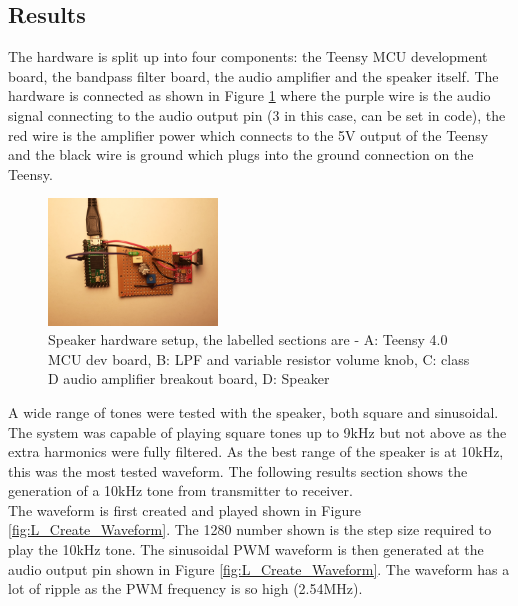 \subsection{Results}
The hardware is split up into four components: the Teensy MCU development board, the bandpass filter board, the audio amplifier and the speaker itself. The hardware is connected as shown in Figure \ref{fig:L_Hardware} where the purple wire is the audio signal connecting to the audio output pin (3 in this case, can be set in code), the red wire is the amplifier power which connects to the 5V output of the Teensy and the black wire is ground which plugs into the ground connection on the Teensy. \\

\begin{figure} [!htb]
	\captionsetup{justification=centering}
	\hfill\includegraphics[width=0.4\textwidth]{./images/speaker/L_Hardware}\hspace{\fill}
	\caption{Speaker hardware setup, the labelled sections are - A: Teensy 4.0 MCU dev board, B: LPF and variable resistor volume knob, C: class D audio amplifier breakout board, D: Speaker}
	\label{fig:L_Hardware}
\end{figure} 

A wide range of tones were tested with the speaker, both square and sinusoidal. The system was capable of playing square tones up to 9kHz but not above as the extra harmonics were fully filtered. As the best range of the speaker is at 10kHz, this was the most tested waveform. The following results section shows the generation of a 10kHz tone from transmitter to receiver. \\

The waveform is first created and played shown in Figure \ref{fig:L_Create_Waveform}. The 1280 number shown is the step size required to play the 10kHz tone. The sinusoidal PWM waveform is then generated at the audio output pin shown in Figure \ref{fig:L_Create_Waveform}. The waveform has a lot of ripple as the PWM frequency is so high (2.54MHz). \\

